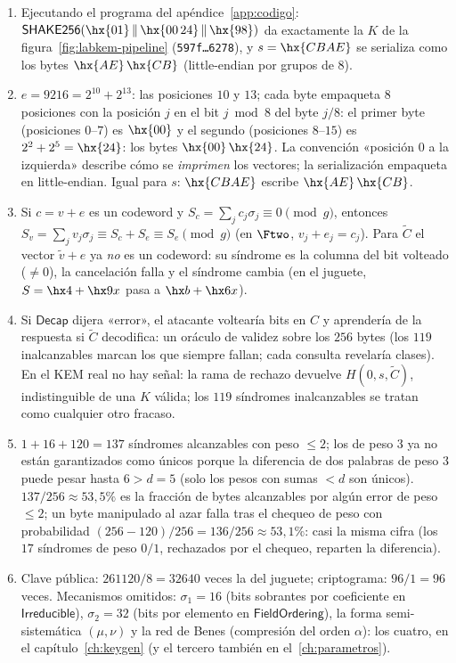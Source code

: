 \begin{enumerate}[leftmargin=1.9em,itemsep=4pt]
  \item Ejecutando el programa del apéndice~\ref{app:codigo}:
        $\textsf{SHAKE256}(\hx{01}\,\|\,\hx{00\,24}\,\|\,\hx{98})$
        da exactamente la $K$ de la
        figura~\ref{fig:labkem-pipeline}
        (\texttt{597f\ldots6278}), y $s=\hx{CBAE}$ se serializa
        como los bytes $\hx{AE}\,\hx{CB}$ (little-endian por grupos
        de $8$).
  \item $e=9216=2^{10}+2^{13}$: las posiciones $10$ y $13$; cada
        byte empaqueta $8$ posiciones con la posición $j$ en el bit
        $j\bmod8$ del byte $j/8$: el primer byte
        (posiciones $0$--$7$) es $\hx{00}$ y el segundo
        (posiciones $8$--$15$) es $2^2+2^5=\hx{24}$: los bytes
        $\hx{00}\,\hx{24}$. La convención «posición $0$ a la
        izquierda» describe cómo se \emph{imprimen} los vectores;
        la serialización empaqueta en little-endian. Igual para
        $s$: $\hx{CBAE}$ escribe $\hx{AE}\,\hx{CB}$.
  \item Si $c=v+e$ es un codeword y $S_c=\sum_jc_j\sigma_j\equiv0
        \pmod g$, entonces
        $S_v=\sum_jv_j\sigma_j\equiv S_c+S_e\equiv S_e\pmod g$
        (en $\Ftwo$, $v_j+e_j=c_j$). Para $\tilde C$ el vector
        $\tilde v+e$ ya \emph{no} es un codeword: su síndrome es la
        columna del bit volteado ($\ne0$), la cancelación falla y el
        síndrome cambia (en el juguete, $S=\hx4+\hx9x$ pasa a
        $\hx b+\hx6x$).
  \item Si $\textsf{Decap}$ dijera «error», el atacante voltearía
        bits en $C$ y aprendería de la respuesta si $\tilde C$
        decodifica: un oráculo de validez sobre los $256$ bytes
        (los $119$ inalcanzables marcan los que siempre fallan; cada
        consulta revelaría clases). En el KEM real no hay señal: la
        rama de rechazo devuelve $H(0,s,\tilde C)$, indistinguible
        de una $K$ válida; los $119$ síndromes inalcanzables se
        tratan como cualquier otro fracaso.
  \item $1+16+120=137$ síndromes alcanzables con peso $\le2$; los de
        peso $3$ ya no están garantizados como únicos porque la
        diferencia de dos palabras de peso $3$ puede pesar hasta
        $6>d=5$ (solo los pesos con sumas $<d$ son únicos).
        $137/256\approx53{,}5\%$ es la fracción de bytes alcanzables
        por algún error de peso $\le2$; un byte manipulado al azar
        falla tras el chequeo de peso con probabilidad
        $(256-120)/256=136/256\approx53{,}1\%$: casi la misma cifra
        (los $17$ síndromes de peso $0/1$, rechazados por el
        chequeo, reparten la diferencia).
  \item Clave pública: $\num{261120}/8=\num{32640}$ veces la del
        juguete; criptograma: $96/1=96$ veces. Mecanismos omitidos:
        $\sigma_1=16$ (bits sobrantes por coeficiente en
        $\textsf{Irreducible}$), $\sigma_2=32$ (bits por elemento en
        $\textsf{FieldOrdering}$), la forma semi-sistemática
        $(\mu,\nu)$ y la red de Benes (compresión del orden
        $\alpha$): los cuatro, en el capítulo~\ref{ch:keygen} (y el
        tercero también en el~\ref{ch:parametros}).
\end{enumerate}


